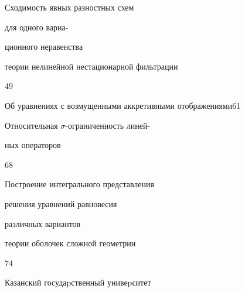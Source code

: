 
















{Сходимость явных разностных схем 


для одного вариа-\newline


ционного неравенства 


теории нелинейной нестационарной фильтрации}{49}







{Об уравнениях с возмущенными аккретивными отображениями}{61}







{Относительная $\sigma$-ограниченность линей-\newline


ных операторов}{68}







{Построение интегрального представления 


решения уравнений равновесия\newline


различных вариантов 


теории оболочек сложной геометрии}{74}








\vfill


\noindent\raisebox{2pt}{\copyright} Казанский госудаpственный унивеpситет





